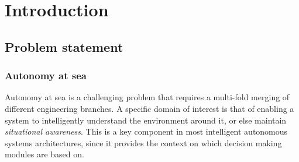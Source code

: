 \chapter{Introduction}
\section{Problem statement}
\subsection{Autonomy at sea}
Autonomy at sea is a challenging problem that requires a multi-fold merging of different engineering branches. A specific domain of interest is that of enabling a system to intelligently understand the environment around it, or else maintain \emph{situational awareness}. This is a key component in most intelligent autonomous systems architectures, since it provides the context on which decision making modules are based on.

